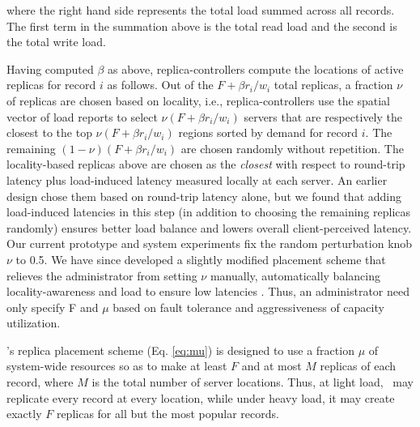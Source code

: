  where the right hand side represents the total load summed across all records. The first term in the summation above is the total read load and the second is the total write load. 
 
Having computed $\beta$ as above, replica-controllers compute the locations of active replicas for record $i$ as follows. Out of the $F + \beta r_i/w_i$ total replicas, a fraction $\nu$ of replicas are chosen based on locality, i.e., replica-controllers use the spatial vector of load reports to select $\nu(F + \beta r_i/w_i)$ servers that are respectively the {closest} to the top $\nu(F + \beta r_i/w_i)$ regions sorted by demand for record $i$. The remaining $(1-\nu)(F + \beta r_i/w_i)$  are chosen randomly without repetition. The locality-based replicas above are chosen as the {\em closest} with respect to round-trip latency plus load-induced latency measured locally at each server. An earlier design chose them based on round-trip latency alone, but we found that adding load-induced latencies in this step (in addition to choosing the remaining replicas randomly) ensures better load balance and lowers overall client-perceived latency.
Our current prototype and system experiments fix the random perturbation knob $\nu$ to 0.5. We have since developed a slightly modified placement scheme that relieves the administrator from setting $\nu$ manually, automatically balancing locality-awareness and load to ensure low latencies \cite{techreport}. Thus, an administrator need only specify F and $\mu$ based on fault tolerance and aggressiveness of capacity utilization.

\auspice's replica placement scheme (Eq. \ref{eq:mu}) is designed to use a fraction $\mu$ of system-wide resources so as to make at least $F$ and at most $M$ replicas of each record, where $M$ is the total number of server locations. Thus, at light load, \auspice\ may replicate every record at every location, while under heavy load, it may create exactly $F$ replicas for all but the most popular records. 


